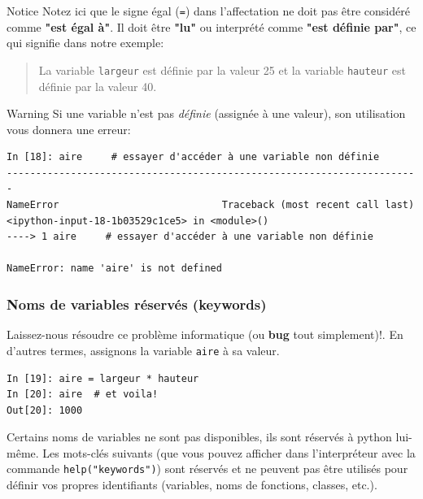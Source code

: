 \documentclass{beamer}
\begin{document}
\begin{frame}

\begin{block}{Notice}
Notez ici que le signe égal (\texttt{=}) dans l'affectation ne doit pas être considéré comme \textbf{"est égal à"}. Il doit être \textbf{"lu"} ou interprété comme \textbf{"est définie par"}, ce qui signifie dans notre exemple:

\begin{quote}
La variable \texttt{largeur} est définie par la valeur 25 et la variable \texttt{hauteur} est définie par la valeur 40.
\end{quote}

\end{block}

\begin{block}{Warning}
Si une variable n'est pas \emph{définie} (assignée à une valeur), son utilisation vous donnera une erreur:

\begin{verbatim}
In [18]: aire     # essayer d'accéder à une variable non définie
-----------------------------------------------------------------------
NameError                            Traceback (most recent call last)
<ipython-input-18-1b03529c1ce5> in <module>()
----> 1 aire     # essayer d'accéder à une variable non définie

NameError: name 'aire' is not defined
\end{verbatim}
\end{block}
\end{frame}

\begin{frame}
\frametitle{Noms de variables réservés (keywords)}

Laissez-nous résoudre ce problème informatique (ou \textbf{bug} tout simplement)!. En d'autres termes, assignons la variable \texttt{aire} à sa valeur.

\begin{verbatim}
In [19]: aire = largeur * hauteur
In [20]: aire  # et voila!
Out[20]: 1000
\end{verbatim}


Certains noms de variables ne sont pas disponibles, ils sont réservés à python lui-même. Les mots-clés suivants (que vous pouvez afficher dans l'interpréteur avec la commande \texttt{help("keywords")}) sont réservés et ne peuvent pas être utilisés pour définir vos propres identifiants (variables, noms de fonctions, classes, etc.).
\end{frame}
\end{document}
